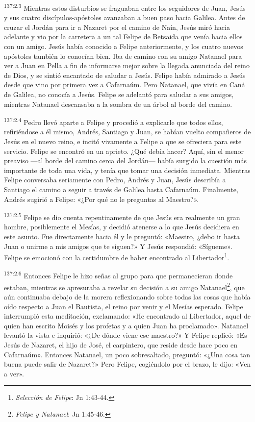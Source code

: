 \par 
\textsuperscript{137:2.3} Mientras estos disturbios se fraguaban entre los seguidores de Juan, Jesús y sus cuatro discípulos-apóstoles avanzaban a buen paso hacia Galilea. Antes de cruzar el Jordán para ir a Nazaret por el camino de Naín, Jesús miró hacia adelante y vio por la carretera a un tal Felipe de Betsaida que venía hacia ellos con un amigo. Jesús había conocido a Felipe anteriormente, y los cuatro nuevos apóstoles también lo conocían bien. Iba de camino con su amigo Natanael para ver a Juan en Pella a fin de informarse mejor sobre la llegada anunciada del reino de Dios, y se sintió encantado de saludar a Jesús. Felipe había admirado a Jesús desde que vino por primera vez a Cafarnaúm. Pero Natanael, que vivía en Caná de Galilea, no conocía a Jesús. Felipe se adelantó para saludar a sus amigos, mientras Natanael descansaba a la sombra de un árbol al borde del camino.

\par 
\textsuperscript{137:2.4} Pedro llevó aparte a Felipe y procedió a explicarle que todos ellos, refiriéndose a él mismo, Andrés, Santiago y Juan, se habían vuelto compañeros de Jesús en el nuevo reino, e incitó vivamente a Felipe a que se ofreciera para este servicio. Felipe se encontró en un aprieto. ¿Qué debía hacer? Aquí, sin el menor preaviso ---al borde del camino cerca del Jordán--- había surgido la cuestión más importante de toda una vida, y tenía que tomar una decisión inmediata. Mientras Felipe conversaba seriamente con Pedro, Andrés y Juan, Jesús describía a Santiago el camino a seguir a través de Galilea hasta Cafarnaúm. Finalmente, Andrés sugirió a Felipe: «¿Por qué no le preguntas al Maestro?».

\par 
\textsuperscript{137:2.5} Felipe se dio cuenta repentinamente de que Jesús era realmente un gran hombre, posiblemente el Mesías, y decidió atenerse a lo que Jesús decidiera en este asunto. Fue directamente hacia él y le preguntó: «Maestro, ¿debo ir hasta Juan o unirme a mis amigos que te siguen?» Y Jesús respondió: «Sígueme». Felipe se emocionó con la certidumbre de haber encontrado al Libertador\footnote{\textit{Selección de Felipe}: Jn 1:43-44.}.

\par 
\textsuperscript{137:2.6} Entonces Felipe le hizo señas al grupo para que permanecieran donde estaban, mientras se apresuraba a revelar su decisión a su amigo Natanael\footnote{\textit{Felipe y Natanael}: Jn 1:45-46.}, que aún continuaba debajo de la morera reflexionando sobre todas las cosas que había oído respecto a Juan el Bautista, el reino por venir y el Mesías esperado. Felipe interrumpió esta meditación, exclamando: «He encontrado al Libertador, aquel de quien han escrito Moisés y los profetas y a quien Juan ha proclamado». Natanael levantó la vista e inquirió: «¿De dónde viene ese maestro?» Y Felipe replicó: «Es Jesús de Nazaret, el hijo de José, el carpintero, que reside desde hace poco en Cafarnaúm». Entonces Natanael, un poco sobresaltado, preguntó: «¿Una cosa tan buena puede salir de Nazaret?» Pero Felipe, cogiéndolo por el brazo, le dijo: «Ven a ver».

